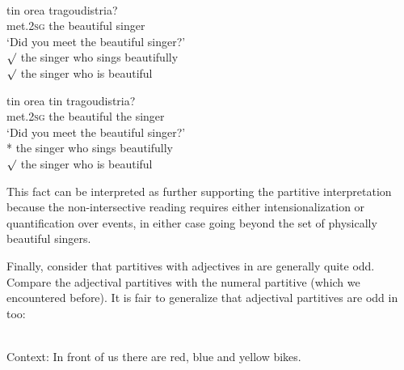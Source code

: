 \documentclass[output=paper,
modfonts
]{langscibook}
\begin{document}
\ea\label{ex:etxeberria:48}  \\
\ea\label{ex:etxeberria:48a}
 {tin} {orea} {tragoudistria}?\\
met.\textsc{2sg} the beautiful singer\\
\glt `Did you meet the beautiful singer?'\\
$\surd$ the singer who sings beautifully\\
$\surd$ the singer who is beautiful

\ex\label{ex:etxeberria:48b}
 {tin} {orea} {tin} {tragoudistria}?\\
met.\textsc{2sg} the beautiful the singer\\
\glt `Did you meet the beautiful singer?'\\ 
* the singer who sings beautifully\\
$\surd$ the singer who is beautiful
\z
\z

This fact can be interpreted as further supporting the partitive interpretation because the non-intersective reading requires either intensionalization or quantification over events, in either case going beyond the set of physically beautiful singers.

Finally, consider that partitives with adjectives in  are generally quite odd. Compare the adjectival partitives with the numeral partitive (which we encountered before). It is fair to generalize that adjectival partitives are odd in  too: 

\ea\label{ex:etxeberria:49}  \\
Context: In front of us there are red, blue and yellow bikes.
\z
\z
\end{document}
